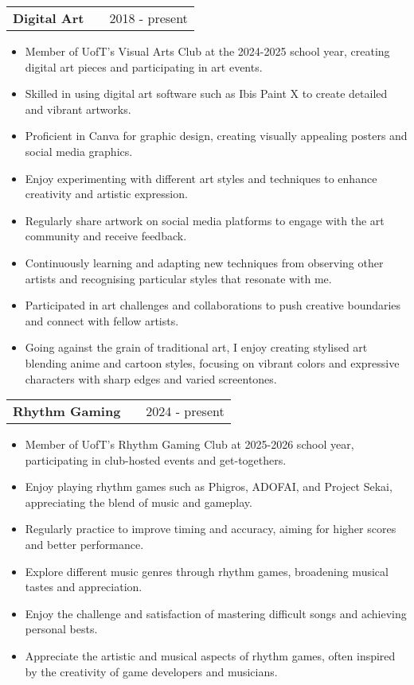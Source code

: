 \documentclass[a4paper,10pt]{article} %
\makeatletter
\newenvironment{joblong}[2]
    {
    \begin{tabularx}{\linewidth}{@{}l X r@{}}
    \textbf{#1} & \hfill &  #2 \\[3.75pt]
    \end{tabularx}
    \begin{minipage}[t]{\linewidth}
    \begin{itemize}[nosep,after=\strut, leftmargin=1em, itemsep=3pt,label=--]
    }
    {
    \end{itemize}
    \end{minipage}    
    }
\makeatother
\begin{document}
\begin{joblong}{Digital Art}{2018 - present}
\item Member of UofT's Visual Arts Club at the 2024-2025 school year, creating digital art pieces and participating in art events.
\item Skilled in using digital art software such as Ibis Paint X to create detailed and vibrant artworks.
\item Proficient in Canva for graphic design, creating visually appealing posters and social media graphics.
\item Enjoy experimenting with different art styles and techniques to enhance creativity and artistic expression.
\item Regularly share artwork on social media platforms to engage with the art community and receive feedback.
\item Continuously learning and adapting new techniques from observing other artists and recognising particular styles that resonate with me.
\item Participated in art challenges and collaborations to push creative boundaries and connect with fellow artists.
\item Going against the grain of traditional art, I enjoy creating stylised art blending anime and cartoon styles, focusing on vibrant colors and expressive characters with sharp edges and varied screentones.
\end{joblong}

\begin{joblong}{Rhythm Gaming}{2024 - present}
\item Member of UofT's Rhythm Gaming Club at 2025-2026 school year, participating in club-hosted events and get-togethers.
\item Enjoy playing rhythm games such as Phigros, ADOFAI, and Project Sekai, appreciating the blend of music and gameplay.
\item Regularly practice to improve timing and accuracy, aiming for higher scores and better performance.
\item Explore different music genres through rhythm games, broadening musical tastes and appreciation.
\item Enjoy the challenge and satisfaction of mastering difficult songs and achieving personal bests.
\item Appreciate the artistic and musical aspects of rhythm games, often inspired by the creativity of game developers and musicians.
\end{joblong}
\end{document}
